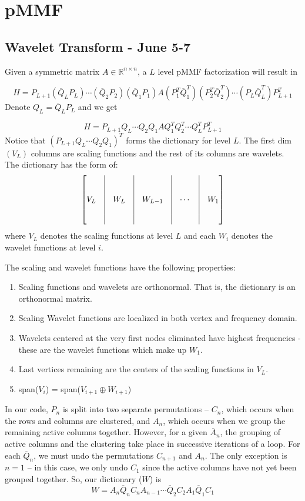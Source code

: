 \documentclass[a4paper]{article}
\newcommand{\R}{\mathbb{R}}
\begin{document}
\section{pMMF}
\subsection{Wavelet Transform - June 5-7}

Given a symmetric matrix $A \in \R^{n\times n}$, a $L$ level pMMF factorization will result in 

$$H = P_{L+1} (\overline{Q}_L P_L) \cdots (\overline{Q}_2 P_2) (\overline{Q}_1 P_1) A (P_1^{T} \overline{Q}_1^{T}) (P_2^{T} \overline{Q}_2^T) \cdots (P_{L} \overline{Q}_L^{T}) P_{L+1}^T$$
Denote $Q_L = \overline{Q}_L P_L$ and we get

$$H = P_{L+1} Q_L \cdots Q_2 Q_1 A Q_1^T Q_2^T \cdots Q_L^T P_{L+1}^T$$
Notice that $(P_{L+1} Q_L \cdots Q_2 Q_1)^T$ forms the dictionary for level $L$. The first dim$(V_L)$ columns are scaling functions and the rest of its columns are wavelets. The dictionary has the form of:
\[\begin{bmatrix}
& \vline & & \vline & & \vline & & \vline  \\
& \vline & & \vline & & \vline & & \vline \\
V_L & \vline & W_L & \vline & W_{L-1} & \vline & \cdots & \vline & W_1  \\
& \vline & & \vline & & \vline & & \vline \\
& \vline & & \vline & & \vline & & \vline \\
\end{bmatrix}\]
where $V_L$ denotes the scaling functions at level $L$ and each $W_i$ denotes the wavelet functions at level $i$.

\smallskip
The scaling and  wavelet functions have the following properties:
\begin{enumerate}
\item Scaling functions and wavelets are orthonormal. That is, the dictionary is an orthonormal matrix.
\item Scaling Wavelet functions are localized in both vertex and frequency domain.
\item Wavelets centered at the very first nodes eliminated have highest frequencies - these are the wavelet functions which make up $W_1$.
\item Last vertices remaining are the centers of the scaling functions in $V_L$.
\item span($V_i$) = span($V_{i+1} \oplus W_{i+1}$)
\end{enumerate}
\smallskip
In our code, $P_n$ is split into two separate permutations -- $C_n$, which occurs when the rows and columns are clustered, and $A_n$, which occurs when we group the remaining active columns together. However, for a given $\overline{A}_n$, the grouping of active columns and the clustering take place in successive iterations of a loop. For each $\overline{Q}_n$, we must undo the permutations $C_{n+1}$ and $A_n$. The only exception is $n = 1$ -- in this case, we only undo $C_1$ since the active columns have not yet been grouped together. So, our dictionary ($W$) is $$W = A_n\overline{Q}_nC_nA_{n-1}\cdots\overline{Q}_2C_2A_1\overline{Q}_1C_1$$
\end{document}

